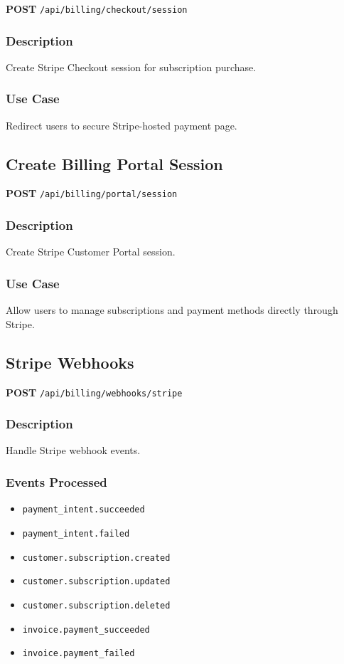 \documentclass[11pt,a4paper]{report}
\begin{document}
\textbf{POST} \texttt{/api/billing/checkout/session}

\subsubsection{Description}
Create Stripe Checkout session for subscription purchase.

\subsubsection{Use Case}
Redirect users to secure Stripe-hosted payment page.

\subsection{Create Billing Portal Session}

\textbf{POST} \texttt{/api/billing/portal/session}

\subsubsection{Description}
Create Stripe Customer Portal session.

\subsubsection{Use Case}
Allow users to manage subscriptions and payment methods directly through Stripe.

\subsection{Stripe Webhooks}

\textbf{POST} \texttt{/api/billing/webhooks/stripe}

\subsubsection{Description}
Handle Stripe webhook events.

\subsubsection{Events Processed}
\begin{itemize}[leftmargin=*]
    \item \texttt{payment\_intent.succeeded}
    \item \texttt{payment\_intent.failed}
    \item \texttt{customer.subscription.created}
    \item \texttt{customer.subscription.updated}
    \item \texttt{customer.subscription.deleted}
    \item \texttt{invoice.payment\_succeeded}
    \item \texttt{invoice.payment\_failed}
\end{itemize}
\end{document}

